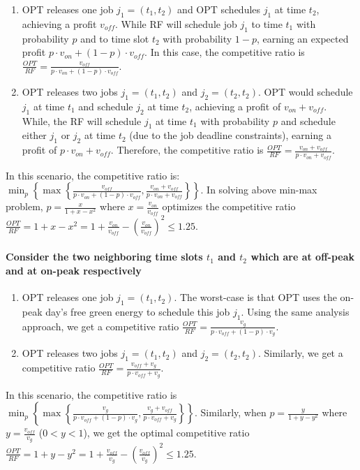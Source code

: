 \documentclass[conference]{IEEEtran}
\begin{document}
\begin{IEEEproof}
\begin{enumerate}
\item OPT releases one job $j_1 = (t_1, t_2)$ and OPT schedules $j_1$ at time $t_2$, achieving a profit $v_{off}$. While RF will schedule job $j_1$ to time $t_1$ with probability $p$ and to time slot $t_2$ with probability $1 - p$, earning an expected profit $p \cdot v_{on} + (1 - p) \cdot v_{off}$. In this case, the competitive ratio is $\frac{OPT}{RF} = \frac{v_{off}}{p \cdot v_{on} + (1 - p) \cdot v_{off}}$.

\item OPT releases two jobs $j_1 = (t_1, t_2)$ and $j_2 = (t_2, t_2)$. OPT would schedule $j_1$ at time $t_1$ and schedule $j_2$ at time $t_2$, achieving a profit of $v_{on} + v_{off}$. While, the RF will schedule $j_1$ at time $t_1$ with probability $p$ and schedule either $j_1$ or $j_2$ at time $t_2$ (due to the job deadline constraints), earning a profit of $p \cdot v_{on} + v_{off}$. Therefore, the competitive ratio is $\frac{OPT}{RF} = \frac{v_{on} + v_{off}}{p \cdot v_{on} + v_{off}}$.
\end{enumerate}

In this scenario, the competitive ratio is: $\min_p \left\{\max\left\{\frac{v_{off}}{p \cdot v_{on} + (1 - p) \cdot v_{off}}, \frac{v_{on} + v_{off} }{p \cdot v_{on} + v_{off}}\right\}\right\}$. In solving above min-max problem, $p = \frac{x}{1 + x - x^2}$ where $x = \frac{v_{on}}{v_{off}}$ optimizes the competitive ratio $\frac{OPT}{RF} = 1 + x - x^2 = 1 + \frac{v_{on}}{v_{off}} - \left(\frac{v_{on}}{v_{off}}\right)^2 \le 1.25$.

\paragraph{Consider the two neighboring time slots $t_1$ and $t_2$ which are at off-peak and at on-peak respectively}

\begin{enumerate}
\item OPT releases one job $j_1 = (t_1, t_2)$. The worst-case is that OPT uses the on-peak day's free green energy to schedule this job $j_1$. Using the same analysis approach, we get a competitive ratio $\frac{OPT}{RF} = \frac{v_g}{p \cdot v_{off} + (1 - p) \cdot v_g}$.

\item OPT releases two jobs $j_1 = (t_1, t_2)$ and $j_2 = (t_2, t_2)$. Similarly, we get a competitive ratio $\frac{OPT}{RF} = \frac{v_{off} + v_g}{p \cdot v_{off} + v_g}$.
\end{enumerate}

In this scenario, the competitive ratio is $\min_p \left\lbrace\max\left\lbrace \frac{v_g}{p \cdot v_{off} + (1 - p) \cdot v_g} , \frac{v_g + v_{off} }{p \cdot v_{off} + v_g}\right\rbrace \right\rbrace$. Similarly, when $p = \frac{y}{1 + y - y^2}$ where $y = \frac{v_{off}}{v_g}$ ($0 < y < 1$), we get the optimal competitive ratio $\frac{OPT}{RF} = 1 + y - y^2 = 1 + \frac{v_{off}}{v_g} - \left(\frac{v_{off}}{v_g}\right)^2  \leq 1.25$.
\end{IEEEproof}
\end{document}
